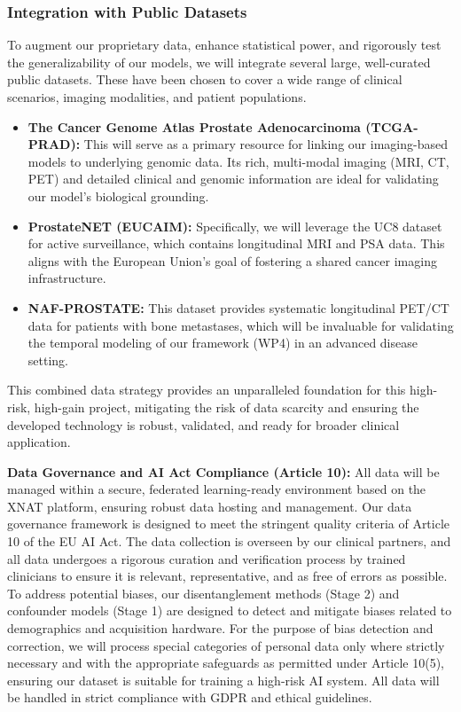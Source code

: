 \documentclass[11pt, a4paper]{article}
\begin{document}
\subsubsection{Integration with Public Datasets}
To augment our proprietary data, enhance statistical power, and rigorously test the generalizability of our models, we will integrate several large, well-curated public datasets. These have been chosen to cover a wide range of clinical scenarios, imaging modalities, and patient populations.
\begin{itemize}
    \item \textbf{The Cancer Genome Atlas Prostate Adenocarcinoma (TCGA-PRAD):} This will serve as a primary resource for linking our imaging-based models to underlying genomic data. Its rich, multi-modal imaging (MRI, CT, PET) and detailed clinical and genomic information are ideal for validating our model’s biological grounding.
    \item \textbf{ProstateNET (EUCAIM):} Specifically, we will leverage the UC8 dataset for active surveillance, which contains longitudinal MRI and PSA data. This aligns with the European Union’s goal of fostering a shared cancer imaging infrastructure.
    \item \textbf{NAF-PROSTATE:} This dataset provides systematic longitudinal PET/CT data for patients with bone metastases, which will be invaluable for validating the temporal modeling of our framework (WP4) in an advanced disease setting.
\end{itemize}
This combined data strategy provides an unparalleled foundation for this high-risk, high-gain project, mitigating the risk of data scarcity and ensuring the developed technology is robust, validated, and ready for broader clinical application.

\textbf{Data Governance and AI Act Compliance (Article 10):} All data will be managed within a secure, federated learning-ready environment based on the XNAT platform, ensuring robust data hosting and management. Our data governance framework is designed to meet the stringent quality criteria of Article 10 of the EU AI Act. The data collection is overseen by our clinical partners, and all data undergoes a rigorous curation and verification process by trained clinicians to ensure it is relevant, representative, and as free of errors as possible. To address potential biases, our disentanglement methods (Stage 2) and confounder models (Stage 1) are designed to detect and mitigate biases related to demographics and acquisition hardware. For the purpose of bias detection and correction, we will process special categories of personal data only where strictly necessary and with the appropriate safeguards as permitted under Article 10(5), ensuring our dataset is suitable for training a high-risk AI system. All data will be handled in strict compliance with GDPR and ethical guidelines.
\end{document}
